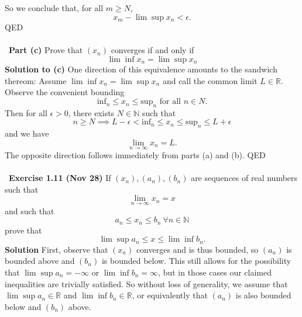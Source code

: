 \documentclass[12 pt]{article}
\newcommand{\R}{\mathbb{R}}
\newcommand{\N}{\mathbb{N}}
\numberwithin{equation}{section}
\begin{document}
{\begin{equation*}
\end{equation*}
So we conclude that, for all $m \geq N$, \begin{equation*}
x_m - \lim \sup x_n < \epsilon.
\end{equation*}
QED\\
\\
\
\textbf{Part (c)} Prove that $(x_n)$ converges if and only if \begin{equation*}
\lim \inf x_n = \lim \sup x_n
\end{equation*}
\textbf{Solution to (c)} One direction of this equivalence amounts to the sandwich thereom: Assume $\lim \inf x_n = \lim \sup x_n$ and call the common limit $L \in \R$. Observe the convenient bounding \begin{equation*}
\mbox{inf}_n \leq x_n \leq \mbox{sup}_n \mbox{ for all } n \in N.
\end{equation*}
Then for all $\epsilon > 0$, there exists $N \in \N$ such that \begin{equation*}
n \geq N \implies L - \epsilon < \mbox{inf}_n \leq x_n \leq \mbox{sup}_n \leq L + \epsilon
\end{equation*}
and we have \begin{equation*}
\lim _{n \to \infty} x_n = L.
\end{equation*}
The opposite direction follows immediately from parts (a) and (b). QED\\
\\
\
\textbf{Exercise 1.11 (Nov 28)} If $(x_n), (a_n), (b_n)$ are sequences of real numbers such that \begin{equation*}
\lim_{n \to \infty} x_n = x
\end{equation*}
and such that \begin{equation*}
a_n \leq x_n \leq b_n \ \forall n \in \N
\end{equation*}
prove that \begin{equation*}
\lim \sup a_n \leq x \leq \lim \inf b_n.
\end{equation*}
\textbf{Solution} First, observe that $(x_n)$ converges and is thus bounded, so $(a_n)$ is bounded above and $(b_n)$ is bounded below. This still allows for the possibility that $\lim \sup a_n = - \infty$ or $\lim \inf b_n = \infty$, but in those cases our claimed inequalities are trivially satisfied. So without loss of generality, we assume that $\lim \sup a_n \in \R$ and $\lim \inf b_n \in \R$, or equivalently that $(a_n)$ is also bounded below and $(b_n)$ above.\\
\\
}
\end{document}
